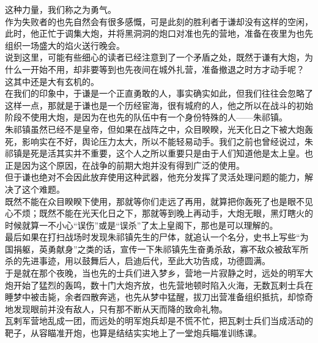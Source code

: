 \begin{multicols}{\theparacolNo}
这种力量，我们称之为勇气。\\

作为失败者的也先自然会有很多感慨，可是此刻的胜利者于谦却没有这样的空闲，此时，他正忙于调集大炮，并将黑洞洞的炮口对准也先的营地，准备在夜里为也先组织一场盛大的焰火送行晚会。\\

说到这里，可能有些细心的读者已经注意到了一个矛盾之处，既然于谦有大炮，为什么一开始不用，却非要等到也先夜间在城外扎营，准备撤退之时方才动手呢？\\

这其中还是大有玄机的。\\

在我们的印象中，于谦是一个正直勇敢的人，事实确实如此，但我们往往会忽略了这样一点，那就是于谦也是一个历经宦海，很有城府的人，他之所以在战斗的初始阶段不使用大炮，是因为在也先的队伍中有一个身份特殊的人——朱祁镇。\\

朱祁镇虽然已经不是皇帝，但如果在战阵之中，众目睽睽，光天化日之下被大炮轰死，影响实在不好，舆论压力太大，所以不能轻易动手。我们之前也曾经说过，朱祁镇是死是活其实并不重要，这个人之所以重要只是由于人们知道他是太上皇。也正是因为这个原因，在战争的前期大炮并没有得到广泛的使用。\\

但于谦也绝对不会因此放弃使用这种武器，他充分发挥了灵活处理问题的能力，解决了这个难题。\\

既然不能在众目睽睽下使用，那就等你们走远了再用，就算把你轰死了也是眼不见心不烦；既然不能在光天化日之下，那就等到晚上再动手，大炮无眼，黑灯瞎火的时候就算一不小心“误伤”或是“误杀”了太上皇阁下，那也是可以理解的。\\

最后如果在打扫战场时发现朱祁镇先生的尸体，就追认一个名分，史书上写些“为国捐躯，英勇献身”之类的话，宣传一下朱祁镇先生奋勇杀敌，寡不敌众被敌军所杀的先进事迹，用以鼓舞后人，启迪后代，至此大功告成，功德圆满。\\

于是就在那个夜晚，当也先的士兵们进入梦乡，营地一片寂静之时，远处的明军大炮开始了猛烈的轰鸣，数十门大炮齐放，也先营地顿时陷入火海，无数瓦剌士兵在睡梦中被击毙，余者四散奔逃，也先从梦中猛醒，拔刀出营准备组织抵抗，却惊奇地发现眼前并没有敌人，只有那不断从天而降的致命礼物。\\

瓦剌军营地乱成一团，而远处的明军炮兵却是不慌不忙，把瓦剌士兵们当成活动的靶子，从容瞄准开炮，也算是结结实实地上了一堂炮兵瞄准训练课。\\


\end{multicols}
